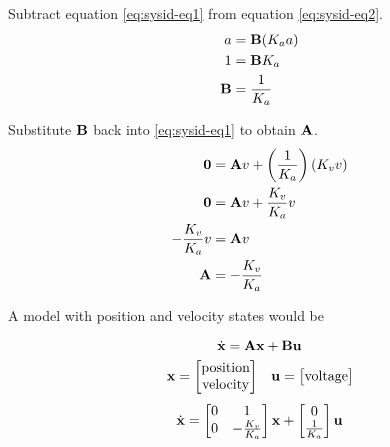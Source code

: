 Subtract equation \eqref{eq:sysid-eq1} from equation \eqref{eq:sysid-eq2}.
\begin{align*}
  a &= \mathbf{B} (K_a a) \\
  1 &= \mathbf{B} K_a \\
  \mathbf{B} &= \frac{1}{K_a}
\end{align*}

Substitute $\mathbf{B}$ back into \eqref{eq:sysid-eq1} to obtain $\mathbf{A}$.
\begin{align*}
  \mathbf{0} &= \mathbf{A}v + \left(\frac{1}{K_a}\right)(K_v v) \\
  \mathbf{0} &= \mathbf{A}v + \frac{K_v}{K_a} v \\
  -\frac{K_v}{K_a} v &= \mathbf{A}v \\
  \mathbf{A} &= -\frac{K_v}{K_a}
\end{align*}

A model with position and velocity states would be
\begin{theorem}
  \begin{equation*}
    \dot{\mathbf{x}} = \mathbf{A}\mathbf{x} + \mathbf{B}\mathbf{u}
  \end{equation*}
  \begin{equation*}
    \begin{array}{cc}
    \mathbf{x} =
      \begin{bmatrix}
        \text{position} \\
        \text{velocity}
      \end{bmatrix} &
    \mathbf{u} =
      \begin{bmatrix}
        \text{voltage}
      \end{bmatrix}
    \end{array}
  \end{equation*}
  \begin{equation}
    \dot{\mathbf{x}} =
      \begin{bmatrix}
        0 & 1 \\
        0 & -\frac{K_v}{K_a}
      \end{bmatrix}
      \mathbf{x} +
      \begin{bmatrix}
        0 \\
        \frac{1}{K_a}
      \end{bmatrix}
      \mathbf{u}
  \end{equation}
\end{theorem}
